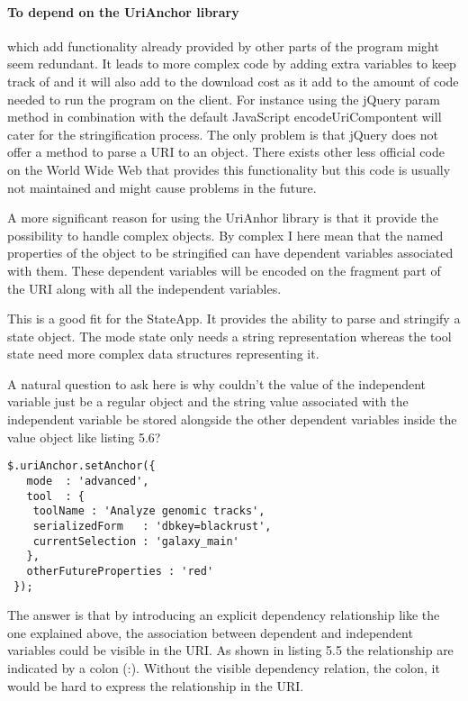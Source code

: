 \documentclass[english]{ifimaster}
\begin{document}
\paragraph{To depend on the UriAnchor library} which add functionality already provided by other parts of the program might seem redundant. It leads to more complex code by adding extra variables to keep track of and it will also add to the download cost as it add to the amount of code needed to run the program on the client. For instance using the jQuery param method in combination with the default JavaScript encodeUriCompontent will cater for the stringification process. The only problem is that jQuery does not offer a method to parse a URI to an object. There exists other less official code on the World Wide Web that provides this functionality but this code is usually not maintained and might cause problems in the future. 

A more significant reason for using the UriAnhor library is that it provide the possibility to handle complex objects. By complex I here mean that the named properties of the object to be stringified can have dependent variables associated with them. These dependent variables will be encoded on the fragment part of the URI along with all the independent variables. 

This is a good fit for the StateApp. It provides the ability to parse and stringify a state object. The mode state only needs a string representation whereas the tool state need more complex data structures representing it. 

A natural question to ask here is why couldn't the value of the independent variable just be a regular object and the string value associated with the independent variable be stored alongside the other dependent variables inside the value object like listing 5.6?

\begin{lstlisting}[caption=Example of a stringified complex object.]
 $.uriAnchor.setAnchor({
   mode  : 'advanced',
   tool  : {
    toolName : 'Analyze genomic tracks',
    serializedForm   : 'dbkey=blackrust',
    currentSelection : 'galaxy_main'
   },
   otherFutureProperties : 'red'
 });
 \end{lstlisting}

The answer is that by introducing an explicit dependency relationship like the one explained above, the association between dependent and independent variables could be visible in the URI. As shown in listing 5.5 the relationship are indicated by a colon (:). Without the visible dependency relation, the colon, it would be hard to express the relationship in the URI. 
\end{document}

